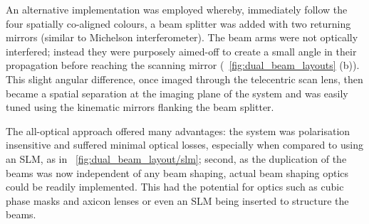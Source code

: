An alternative implementation was employed whereby, immediately follow the four spatially co-aligned colours, a beam splitter was added with two returning mirrors (similar to Michelson interferometer).
The beam arms were not optically interfered; instead they were purposely aimed-off to create a small angle in their propagation before reaching the scanning mirror (\figurename~\ref{fig:dual_beam_layouts} (b)).
This slight angular difference, once imaged through the telecentric scan lens, then became a spatial separation at the imaging plane of the system and was easily tuned using the kinematic mirrors flanking the beam splitter.

The all-optical approach offered many advantages: the system was polarisation insensitive and suffered minimal optical losses, especially when compared to using an \gls{SLM}, as in \figurename~\ref{fig:dual_beam_layout/slm}; second, as the duplication of the beams was now independent of any beam shaping, actual beam shaping optics could be readily implemented.
This had the potential for optics such as cubic phase masks and axicon lenses or even an \gls{SLM} being inserted to structure the beams.

